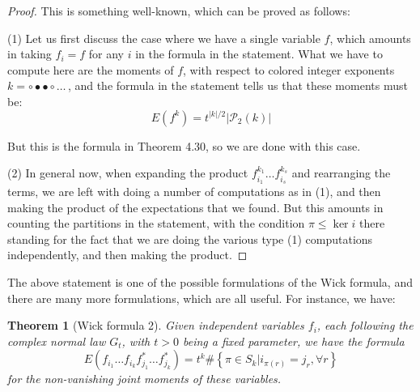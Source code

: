 \documentclass[12pt]{amsbook}
\newtheorem{theorem}{Theorem}[chapter]
\begin{document}
\begin{proof}
This is something well-known, which can be proved as follows:

\medskip

(1) Let us first discuss the case where we have a single variable $f$, which amounts in taking $f_i=f$ for any $i$ in the formula in the statement. What we have to compute here are the moments of $f$, with respect to colored integer exponents $k=\circ\bullet\bullet\circ\ldots\,$, and the formula in the statement tells us that these moments must be:
$$E(f^k)=t^{|k|/2}|\mathcal P_2(k)|$$

But this is the formula in Theorem 4.30, so we are done with this case.

\medskip

(2) In general now, when expanding the product $f_{i_1}^{k_1}\ldots f_{i_s}^{k_s}$ and rearranging the terms, we are left with doing a number of computations as in (1), and then making the product of the expectations that we found. But this amounts in counting the partitions in the statement, with the condition $\pi\leq\ker i$ there standing for the fact that we are doing the various type (1) computations independently, and then making the product.
\end{proof}

The above statement is one of the possible formulations of the Wick formula, and there are many more formulations, which are all useful. For instance, we have:


\begin{theorem}[Wick formula 2]
Given independent variables $f_i$, each following the complex normal law $G_t$, with $t>0$ being a fixed parameter, we have the formula
$$E\left(f_{i_1}\ldots f_{i_k}f_{j_1}^*\ldots f_{j_k}^*\right)=t^k\#\left\{\pi\in S_k\Big|i_{\pi(r)}=j_r,\forall r\right\}$$
for the non-vanishing joint moments of these variables.
\end{theorem}
\end{document}
